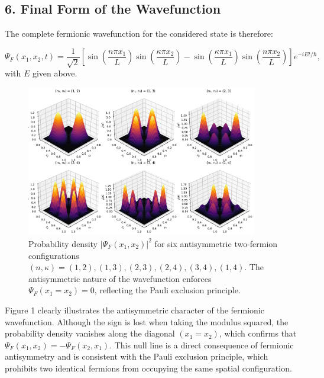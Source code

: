 \subsection*{6. Final Form of the Wavefunction}

The complete fermionic wavefunction for the considered state is therefore:


\begin{equation}
    \Psi_F(x_1, x_2, t) = \frac{1}{\sqrt{2}}
    \left[
    \sin\left(\frac{n\pi x_1}{L}\right)\sin\left(\frac{\kappa\pi x_2}{L}\right)
    - \sin\left(\frac{\kappa\pi x_1}{L}\right)\sin\left(\frac{n\pi x_2}{L}\right)
    \right]
    e^{-iEt/\hbar},
\end{equation}
with $E$ given above.

\begin{figure}[h!]
    \centering
    \includegraphics[width=0.9\textwidth]{ figures/fermions_3D_collage(1).pdf}
    \caption{Probability density $|\Psi_F(x_1, x_2)|^2$ for six antisymmetric two-fermion configurations
    $(n,\kappa) = (1,2), (1,3), (2,3), (2,4), (3,4), (1,4)$.
    The antisymmetric nature of the wavefunction enforces $\Psi_F(x_1 = x_2) = 0$, reflecting the Pauli exclusion principle.}
    \label{fig:fermion_3D_collage}
\end{figure}


Figure 1 clearly illustrates the antisymmetric character of the fermionic wavefunction. Although the sign is lost when taking the modulus squared, the probability density vanishes along the diagonal $(x_1 = x_2)$, which confirms that $\Psi_F(x_1,x_2) = -\Psi_F(x_2,x_1)$. This null line is a direct consequence of fermionic antisymmetry and is consistent with the Pauli exclusion principle, which prohibits two identical fermions from occupying the same spatial configuration.

